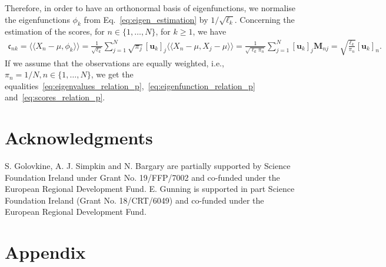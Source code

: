 \documentclass[times,sort&compress,3p]{elsarticle}
\theoremstyle{plain}%
\theoremstyle{definition}
\newcommand{\inH}[2]{\langle\!\langle#1, #2\rangle\!\rangle}
\begin{document}
Therefore, in order to have an orthonormal basis of eigenfunctions, we normalise the eigenfunctions $\phi_k$ from Eq.~\eqref{eq:eigen_estimation} by $1 / \sqrt{\ell_k}$.
Concerning the estimation of the scores, for $n \in \{1, \dots, N\}$, for $k \geq 1$, we have
\begin{align}
    \mathfrak{c}_{nk} = \inH{X_n - \mu}{\phi_k} = \frac{1}{\sqrt{\ell_k}}\sum_{j = 1}^N \sqrt{\pi_j}[\boldsymbol{u}_{k}]_j \inH{X_n - \mu}{X_j - \mu}
    = \frac{1}{\sqrt{\ell_k\pi_n}}\sum_{j = 1}^N [\boldsymbol{u}_{k}]_j \mathbf{M}_{nj} = \sqrt{\frac{\ell_k}{\pi_n}}[\boldsymbol{u}_{k}]_n.
\end{align}
If we assume that the observations are equally weighted, i.e., $\pi_n = 1 / N, n \in \{1, \dots, N\}$, we get the equalities~\eqref{eq:eigenvalues_relation_p},~\eqref{eq:eigenfunction_relation_p} and~\eqref{eq:scores_relation_p}.




\section*{Acknowledgments}

S. Golovkine, A. J. Simpkin and N. Bargary are partially supported by Science Foundation Ireland under Grant No. 19/FFP/7002 and co-funded under the European Regional Development Fund. E. Gunning is supported in part Science Foundation Ireland (Grant No. 18/CRT/6049) and co-funded under the European Regional Development Fund.

\section*{Appendix}
\end{document}
